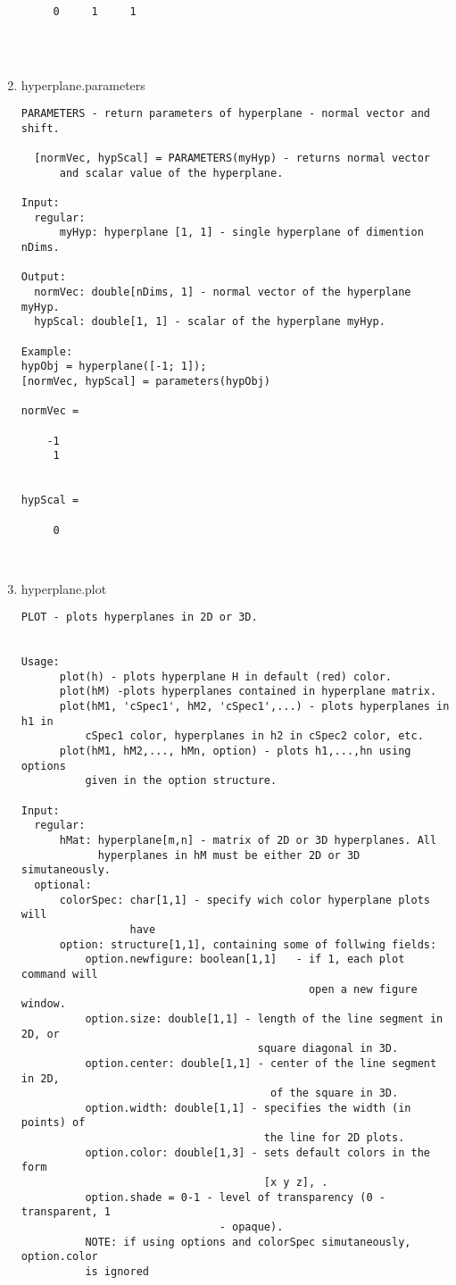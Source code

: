 \begin{enumerate}
\begin{lstlisting}
     0     1     1




\end{lstlisting}
\fontfamily{\familydefault}
\selectfont
\item {hyperplane.parameters}
\selectfont
\begin{lstlisting}
PARAMETERS - return parameters of hyperplane - normal vector and shift.

  [normVec, hypScal] = PARAMETERS(myHyp) - returns normal vector
      and scalar value of the hyperplane.

Input:
  regular:
      myHyp: hyperplane [1, 1] - single hyperplane of dimention nDims.

Output:
  normVec: double[nDims, 1] - normal vector of the hyperplane myHyp.
  hypScal: double[1, 1] - scalar of the hyperplane myHyp.

Example:
hypObj = hyperplane([-1; 1]);
[normVec, hypScal] = parameters(hypObj)

normVec =

    -1
     1


hypScal =

     0



\end{lstlisting}
\fontfamily{\familydefault}
\selectfont
\item {hyperplane.plot}
\selectfont
\begin{lstlisting}
PLOT - plots hyperplanes in 2D or 3D.


Usage:
      plot(h) - plots hyperplane H in default (red) color.
      plot(hM) -plots hyperplanes contained in hyperplane matrix.
      plot(hM1, 'cSpec1', hM2, 'cSpec1',...) - plots hyperplanes in h1 in
          cSpec1 color, hyperplanes in h2 in cSpec2 color, etc.
      plot(hM1, hM2,..., hMn, option) - plots h1,...,hn using options
          given in the option structure.

Input:
  regular:
      hMat: hyperplane[m,n] - matrix of 2D or 3D hyperplanes. All
            hyperplanes in hM must be either 2D or 3D simutaneously.
  optional:
      colorSpec: char[1,1] - specify wich color hyperplane plots will
                 have
      option: structure[1,1], containing some of follwing fields:
          option.newfigure: boolean[1,1]   - if 1, each plot command will
                                             open a new figure window.
          option.size: double[1,1] - length of the line segment in 2D, or
                                     square diagonal in 3D.
          option.center: double[1,1] - center of the line segment in 2D,
                                       of the square in 3D.
          option.width: double[1,1] - specifies the width (in points) of
                                      the line for 2D plots.
          option.color: double[1,3] - sets default colors in the form
                                      [x y z], .
          option.shade = 0-1 - level of transparency (0 - transparent, 1
                               - opaque).
          NOTE: if using options and colorSpec simutaneously, option.color
          is ignored


\end{lstlisting}
\end{enumerate}

